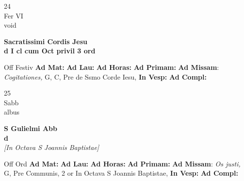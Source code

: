 \documentclass[10pt, openany]{book}
\begin{document}
    \begin{center}
        \begin{minipage}{3.5in}
            \vspace{2em}
            \begin{minipage}{0.5in}
                {\Huge 24} \\
                {\normalsize Fer VI} \\
                {\normalsize void}
            \end{minipage}
            \begin{minipage}{3.0in}
                \textbf{ \large Sacratissimi Cordis Jesu \\
                \textnormal{\normalsize d I cl cum Oct privil 3 ord}} \\ 
            \end{minipage}
            \begin{justify}Off Festiv
                \textbf{Ad Mat: }
                \textbf{Ad Lau: }
                \textbf{Ad Horas: }
                \textbf{Ad Primam: }\textbf{Ad Missam}: \textit{Cogitationes,} G, C, Pre de Ssmo Corde Iesu,  
                \textbf{In Vesp: }
                \textbf{Ad Compl: }
            \end{justify}
        \end{minipage}
    \end{center}

    \begin{center}
        \begin{minipage}{3.5in}
            \vspace{2em}
            \begin{minipage}{0.5in}
                {\Huge 25} \\
                {\normalsize Sabb} \\
                {\normalsize albus}
            \end{minipage}
            \begin{minipage}{3.0in}
                \textbf{ \large S Gulielmi Abb \\
                \textnormal{\normalsize d}} \\ \textit{[In Octava S Joannis Baptistae]} \\ 
            \end{minipage}
            \begin{justify}Off Ord
                \textbf{Ad Mat: }
                \textbf{Ad Lau: }
                \textbf{Ad Horas: }
                \textbf{Ad Primam: }\textbf{Ad Missam}: \textit{Os justi,} G, Pre Communis, 2 or In Octava S Joannis Baptistae,  
                \textbf{In Vesp: }
                \textbf{Ad Compl: }
            \end{justify}
        \end{minipage}
    \end{center}
\end{document}
